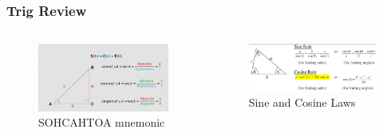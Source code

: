 \documentclass{beamer}
\begin{document}
\begin{frame}
\frametitle{Trig Review}
\begin{columns}[T] %
    \begin{figure}
        \centering
        \includegraphics[width=\linewidth]{phys12-math-sohcahtoa-mnemonic.png}
        \caption{SOHCAHTOA mnemonic}
    \end{figure}

    \begin{figure}
        \centering
        \includegraphics[width=\linewidth]{phys12-math-sine-cosine-laws.png}
        \caption{Sine and Cosine Laws}
    \end{figure}
\end{columns}
\end{frame}
\end{document}
